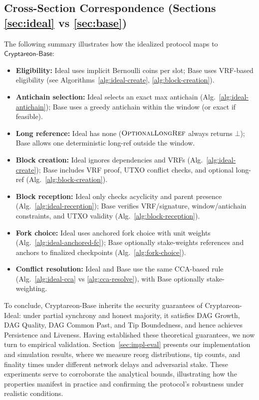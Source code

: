 \documentclass[11pt]{article}
\newcommand{\ProjBase}{\ensuremath{\mathsf{Cryptareon\text{-}Base}}\xspace}
\newcommand{\OptionalLongRef}{\textsc{OptionalLongRef}\xspace}
\begin{document}
\subsection{Cross-Section Correspondence (Sections \ref{sec:ideal} vs \ref{sec:base})}
The following summary illustrates how the idealized protocol maps to \ProjBase:
\begin{itemize}
  \item \textbf{Eligibility:} Ideal uses implicit Bernoulli coins per slot; Base uses VRF-based eligibility (see Algorithms~\ref{alg:ideal-create}, \ref{alg:block-creation}).
  \item \textbf{Antichain selection:} Ideal selects an exact max antichain (Alg.~\ref{alg:ideal-antichain}); Base uses a greedy antichain within the window (or exact if feasible).
  \item \textbf{Long reference:} Ideal has none ($\OptionalLongRef$ always returns $\bot$); Base allows one deterministic long-ref outside the window.
  \item \textbf{Block creation:} Ideal ignores dependencies and VRFs (Alg.~\ref{alg:ideal-create}); Base includes VRF proof, UTXO conflict checks, and optional long-ref (Alg.~\ref{alg:block-creation}).
  \item \textbf{Block reception:} Ideal only checks acyclicity and parent presence (Alg.~\ref{alg:ideal-reception}); Base verifies VRF/signature, window/antichain constraints, and UTXO validity (Alg.~\ref{alg:block-reception}).
  \item \textbf{Fork choice:} Ideal uses anchored fork choice with unit weights (Alg.~\ref{alg:ideal-anchored-fc}); Base optionally stake-weights references and anchors to finalized checkpoints (Alg.~\ref{alg:fork-choice}).
  \item \textbf{Conflict resolution:} Ideal and Base use the same CCA-based rule (Alg.~\ref{alg:ideal-cca} vs \ref{alg:cca-resolve}), with Base optionally stake-weighting.
\end{itemize}


To conclude, Cryptareon-Base inherits the security guarantees of Cryptareon-Ideal: under partial
synchrony and honest majority, it satisfies DAG Growth, DAG Quality, DAG Common Past, and Tip
Boundedness, and hence achieves Persistence and Liveness. Having established these theoretical
guarantees, we now turn to empirical validation. Section~\ref{sec:impl-eval}
 presents our implementation and
simulation results, where we measure reorg distributions, tip counts, and finality times under
different network delays and adversarial stake. These experiments serve to corroborate the
analytical bounds, illustrating how the properties manifest in practice and confirming the protocol’s
robustness under realistic conditions.








%
\end{document}
